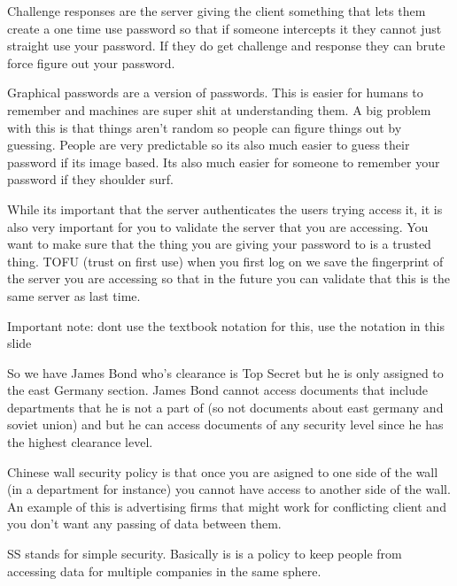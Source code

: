\documentclass{article}
\begin{document}

Challenge responses are the server giving the client something that lets them create a one time use password so that if someone intercepts it they cannot just straight use your password. If they do get challenge and response they can brute force figure out your password.



Graphical passwords are a version of passwords. This is easier for humans to remember and machines are super shit at understanding them. A big problem with this is that things aren't random so people can figure things out by guessing. People are very predictable so its also much easier to guess their password if its image based. Its also much easier for someone to remember your password if they shoulder surf.


While its important that the server authenticates the users trying access it, it is also very important for you to validate the server that you are accessing. You want to make sure that the thing you are giving your password to is a trusted thing. TOFU (trust on first use) when you first log on we save the fingerprint of the server you are accessing so that in the future you can validate that this is the same server as last time.




Important note: dont use the textbook notation for this, use the notation in this slide


So we have James Bond who's clearance is Top Secret but he is only assigned to the east Germany section. James Bond cannot access documents that include departments that he is not a part of (so not documents about east germany and soviet union) and but he can access documents of any security level since he has the highest clearance level.




Chinese wall security policy is that once you are asigned to one side of the wall (in a department for instance) you cannot have access to another side of the wall. An example of this is advertising firms that might work for conflicting client and you don't want any passing of data between them.

SS stands for simple security. Basically is is a policy to keep people from accessing data for multiple companies in the same sphere.
\end{document}

